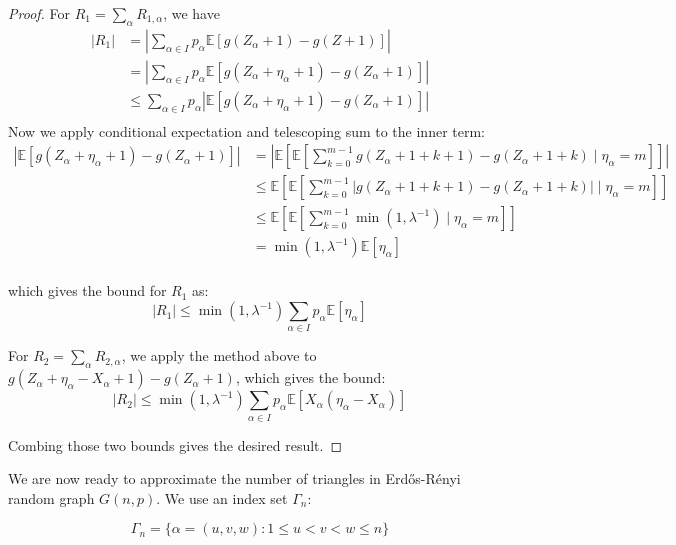 \documentclass{article}
\begin{document}
\begin{proof}
    For $R_1=\sum_\alpha R_{1,\alpha}$, we have
    \begin{align*}
        |R_1| &= \left|\sum_{\alpha \in I} p_\alpha \mathbb{E}[g(Z_\alpha+1) - g(Z+1)]\right| \\
        &= \left|\sum_{\alpha \in I} p_\alpha \mathbb{E}[g(Z_\alpha + \eta_\alpha +1) - g(Z_\alpha+1)]\right|\\
        &\leq \sum_{\alpha \in I} p_\alpha |\mathbb{E}[g(Z_\alpha + \eta_\alpha +1) - g(Z_\alpha+1)]|\\
    \end{align*}
    Now we apply conditional expectation and telescoping sum to the inner term:
    \begin{align*}
        |\mathbb{E}[g(Z_\alpha + \eta_\alpha +1) - g(Z_\alpha+1)]| &= \left|\mathbb{E}\left[\mathbb{E}[\sum_{k=0}^{m-1} g(Z_\alpha + 1 + k+1) - g(Z_\alpha + 1 + k)\mid \eta_\alpha = m]\right]\right|\\
        &\leq \mathbb{E}\left[\mathbb{E}[\sum_{k=0}^{m-1} |g(Z_\alpha + 1 + k+1) - g(Z_\alpha + 1 + k)|\mid \eta_\alpha = m]\right]\\
        &\leq \mathbb{E}\left[\mathbb{E}[\sum_{k=0}^{m-1} \min (1, \lambda^{-1})\mid \eta_\alpha = m]\right]\\
        &= \min (1, \lambda^{-1}) \mathbb{E}[ \eta_\alpha]\\
    \end{align*}

    which gives the bound for $R_1$ as:
    \begin{equation*}
        |R_1| \leq \min (1, \lambda^{-1}) \sum_{\alpha \in I} p_\alpha \mathbb{E}[ \eta_\alpha]
    \end{equation*}

    For $R_2=\sum_\alpha R_{2,\alpha}$, we apply the method above to $g(Z_\alpha + \eta_\alpha - X_\alpha + 1) - g(Z_\alpha + 1)$, which gives the bound:
    \begin{equation*}
        |R_2| \leq \min (1, \lambda^{-1}) \sum_{\alpha \in I} p_\alpha \mathbb{E}[ X_\alpha (\eta_\alpha - X_\alpha)]
    \end{equation*}

    Combing those two bounds gives the desired result.
\end{proof}  

We are now ready to approximate the number of triangles in Erd\H{o}s-R\'{e}nyi random graph $G(n,p)$.  We use an index set $\Gamma_n$:

\begin{equation*}
    \Gamma_{n}=\{\alpha=(u,v,w):1\leq u<v<w\leq n\}
\end{equation*}
\end{document}

